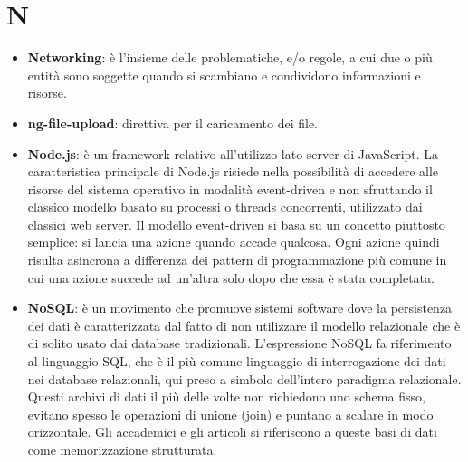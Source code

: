 	\section{N}
\begin{itemize}
	\item
	\textbf{Networking}: è l’insieme delle problematiche, e/o regole, a cui due o più entità sono soggette quando si scambiano e condividono informazioni e risorse. 
	\item
	\textbf{ng-file-upload}: direttiva per il caricamento dei file. 
	\item
	\textbf{Node.js}: è un framework relativo all'utilizzo lato server di JavaScript.
	 La caratteristica principale di Node.js risiede nella possibilità di accedere alle risorse del sistema operativo in modalità event-driven e non sfruttando il classico modello basato su processi o threads concorrenti, utilizzato dai classici web server. Il modello event-driven si basa su un concetto piuttosto semplice: si lancia una azione quando accade qualcosa. Ogni azione quindi risulta asincrona a differenza dei pattern di programmazione più comune in cui una azione succede ad un'altra solo dopo che essa è stata completata.
	 \item
	 \textbf{NoSQL}: è un movimento che promuove sistemi software dove la persistenza dei dati è caratterizzata dal fatto di non utilizzare il modello relazionale che è di solito usato dai database tradizionali. L'espressione NoSQL fa riferimento al linguaggio SQL, che è il più comune linguaggio di interrogazione dei dati nei database relazionali, qui preso a simbolo dell'intero paradigma relazionale.
	 Questi archivi di dati il più delle volte non richiedono uno schema fisso, evitano spesso le operazioni di unione (join) e puntano a scalare in modo orizzontale. Gli accademici e gli articoli si riferiscono a queste basi di dati come memorizzazione strutturata.
\end{itemize}